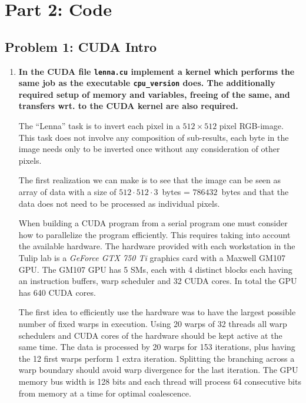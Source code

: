 \section*{Part 2: Code}

\subsection*{Problem 1: CUDA Intro}

\begin{enumerate}

\item \textbf{In the CUDA file \texttt{lenna.cu} implement a kernel which performs the same job as the executable \texttt{cpu\_version} does. The additionally required setup of memory and variables, freeing of the same, and transfers wrt. to the CUDA kernel are also required.}

The ``Lenna'' task is to invert each pixel in a $512 \times 512$ pixel RGB-image. This task does not involve any composition of sub-results, each byte in the image needs only to be inverted once without any consideration of other pixels.

The first realization we can make is to see that the image can be seen as array of data with a size of $512 \cdot 512 \cdot 3$~bytes = $786432$~bytes and that the data does not need to be processed as individual pixels.

When building a \ac{CUDA} program from a serial program one must consider how to parallelize the program efficiently. This requires taking into account the available hardware. The hardware provided with each workstation in the Tulip lab is a \textit{GeForce GTX 750 Ti} graphics card with a Maxwell GM107 \ac{GPU}. The GM107 \ac{GPU} has 5 \acp{SM}, each with 4 distinct blocks each having an instruction buffers, warp scheduler and 32 \ac{CUDA} cores. In total the \ac{GPU} has 640 \ac{CUDA} cores.

The first idea to efficiently use the hardware was to have the largest possible number of fixed warps in execution. Using 20 warps of 32 threads all warp schedulers and \ac{CUDA} cores of the hardware should be kept active at the same time. The data is processed by 20 warps for 153 iterations, plus having the 12 first warps perform 1 extra iteration. Splitting the branching across a warp boundary should avoid warp divergence for the last iteration. The \ac{GPU} memory bus width is 128 bits and each thread will process 64 consecutive bits from memory at a time for optimal coalescence.


\end{enumerate}
